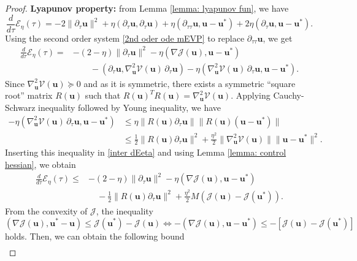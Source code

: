 \documentclass[11pt]{article}
\newcommand{\bu}{\mathbf{u}}
\begin{document}
\begin{proof}
\noindent \textbf{Lyapunov property: } from Lemma \ref{lemma: lyapunov fun}, we have
$$
\frac{d}{d\tau}\mathcal{E}_\eta(\tau)  = -2 \|\partial_\tau \bu\|^2 + \eta (\partial_\tau \bu, \partial_\tau \bu) + \eta (\partial_{\tau\tau}\bu, \bu-\bu^*) + 2 \eta (\partial_{\tau}\bu, \bu-\bu^*).
$$Using the second order system \eqref{2nd oder ode mEVP} to replace $\partial_{\tau\tau}\bu$, we get
\begin{equation}
\label{inter dEeta}
    \begin{aligned}
    \frac{d}{d\tau}\mathcal{E}_\eta(\tau)  = &  -(2-\eta) \|\partial_\tau \bu\|^2  - \eta (\nabla \mathcal{J}(\bu), \bu-\bu^*) \\
    &\qquad -(\partial_\tau \bu, \nabla^2_{\bu} \mathcal{V}(\bu)\, \partial_\tau \bu)- \eta (\nabla^2_{\bu} \mathcal{V}(\bu)\,  \partial_\tau \bu , \bu-\bu^*).
\end{aligned}
\end{equation}
Since $\nabla^2_{\bu} \mathcal{V}(\bu)\succeq 0 $ and as it is symmetric, there exists a symmetric ``square root'' matrix $R(\bu)$ such that $R(\bu)^T R(\bu) = \nabla^2_{\bu} \mathcal{V}(\bu)$. Applying Cauchy-Schwarz inequality followed by Young inequality, we have 
$$\begin{aligned}
    -\eta (\nabla^2_{\bu} \mathcal{V}(\bu)\,  \partial_\tau \bu , \bu-\bu^*) &\leq \eta \|R(\bu)\partial_\tau \bu\| \|R(\bu)(\bu-\bu^*) \|\\
    &\leq \frac{1 }{2 }\|R(\bu)\partial_\tau \bu\|^2 +  \frac{\eta^2 }{2}\|\nabla^2_{\bu} \mathcal{V}(\bu)\|\|\bu-\bu^*\|^2.
\end{aligned}$$ Inserting this inequality in \eqref{inter dEeta} and using Lemma \ref{lemma: control hessian}, we obtain
\begin{equation*}
    \begin{aligned}
    \frac{d}{d\tau}\mathcal{E}_\eta(\tau)  \leq &  -(2-\eta) \|\partial_\tau \bu\|^2  - \eta (\nabla \mathcal{J}(\bu), \bu-\bu^*) \\
    &\quad -\frac12\|R(\bu)\partial_\tau \bu\|^2 +  \frac{\eta^2}{2} M (\mathcal{J}(\bu)-\mathcal{J}(\bu^*)).
\end{aligned}
\end{equation*}
From the convexity of $\mathcal{J}$, the inequality 
$$(\nabla \mathcal{J}(\bu), \bu^*-\bu)\leq\mathcal{J}(\bu^*)-\mathcal{J}(\bu) \Leftrightarrow -(\nabla \mathcal{J}(\bu), \bu-\bu^*)\leq - \left [\mathcal{J}(\bu)-\mathcal{J}(\bu^*)\right]
$$holds. Then, we can obtain the following bound
$$
\begin{aligned}

\end{aligned}$$
\end{proof}
\end{document}

